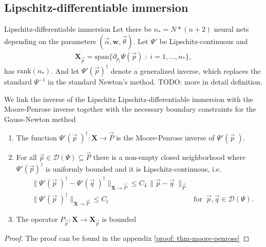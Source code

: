 \subsection{Lipschitz-differentiable immersion}
\begin{mydef}{Lipschitz-differentiable immersion}
    Let there be $n_* = N*(n+2)$ neural nets depending on the parameters
    $(\vec{\alpha}, \mathbf{w}, \vec{\theta})$. Let $\Psi'$ be
    Lipschitz-continuous and
    \begin{align}
        \mathbf{X}_{\vec{p}} =
        \text{span}\{\partial_{p_i}\Psi(\vec{p})\;:\;i=1,\ldots,n_*\},
        \label{eq: lpdi-property}
    \end{align}
    has $\text{rank}(n_*)$.
    And let $\Psi'(\vec{p})^{\dagger}$ denote a generalized inverse,
    which replaces the standard $\Psi^{-1}$ in the standard Newton's method.
    TODO: more in detail definition.
\end{mydef}
We link the inverse of the Lipschitz Lipschitz-differentiable immersion with
the Moore-Penrose inverse together with the necessary boundary constraints
for the Gauss-Newton method
\begin{theorem}
    \label{thm: moore-penrose}
    \begin{enumerate}
        \item The function $\Psi'(\vec{p}\;)^{\dagger}: \mathbf{X} \to \vec{P}$
            is the Moore-Penrose inverse of $\Psi'(\vec{p}\;)$.
        \item For all $\vec{p} \in \mathcal{D}(\Psi) \subseteq \vec{P}$
            there is a non-empty closed neighborhood where
            $\Psi'(\vec{p})^{\dagger}$ is uniformly bounded and it is
            Lipschitz-continuous, i.e.
            \begin{align}
                &\|\Psi'(\vec{p}\;)^{\dagger} -
                \Psi'(\vec{q}\;)^{\dagger}\|_{\mathbf{X}\to\vec{P}}
                \leq C_L \|\vec{p} - \vec{q}\;\|_{\vec{P}}&\\
                &\|\Psi'(\vec{p}\;)^{\dagger}
                \|_{\mathbf{X}\to\vec{P}} \leq C_l\qquad &\text{for}\;\;
                \vec{p}, \vec{q}\in \mathcal{D}(\Psi).
            \end{align}
    \item The operator $P_{\vec{p}}: \mathbf{X} \to \mathbf{X}_{\vec{p}}$ is
            bounded
    \end{enumerate}
\end{theorem}
\begin{proof}
    The proof can be found in the appendix \ref{proof: thm-moore-penrose}
\end{proof}

